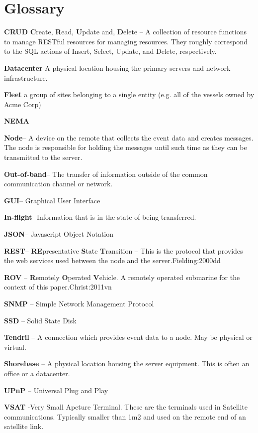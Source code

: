 \chapter{Glossary}
\textbf{CRUD}        \textbf{C}reate, \textbf{R}ead, \textbf{U}pdate and, \textbf{D}elete – A collection of resource functions to manage RESTful resources for managing resources. They roughly correspond to the SQL actions of Insert, Select, Update, and Delete, respectively.

\textbf{Datacenter}      A physical location housing the primary servers and network infrastructure.

\textbf{Fleet}      a group of sites belonging to a single entity (e.g. all of the vessels owned  by Acme Corp)

\textbf{NEMA}        

\textbf{Node}– A device on the remote that collects the event data and creates messages. The node is responsible for holding the messages until such time as they can be transmitted to the server.

\textbf{Out-of-band}– The transfer of information outside of the common communication channel or network.

\textbf{GUI}– Graphical User Interface

\textbf{In-flight}- Information that is in the state of being transferred.

\textbf{JSON}– Javascript Object Notation

\textbf{REST}– \textbf{RE}presentative \textbf{S}tate \textbf{T}ransition – This is the protocol that provides the web services used between the node and the server.{Fielding:2000dd}

\textbf{ROV} – \textbf{R}emotely \textbf{O}perated \textbf{V}ehicle. A remotely operated submarine for the context of this paper.{Christ:2011vn}

\textbf{SNMP} – Simple Network Management Protocol

\textbf{SSD} – Solid State Disk

\textbf{Tendril} – A connection which provides event data to a node. May be physical or virtual.

\textbf{Shorebase} – A physical location housing the server equipment. This is often an office or a datacenter.

\textbf{UPnP} – Universal Plug and Play

\textbf{VSAT}	-Very Small Apeture Terminal. These are the terminals used in Satellite communications. Typically smaller than 1m2 and used on the remote end of an satellite link.
